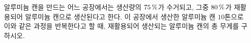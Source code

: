 알루미늄 캔을 만드는 어느 공장에서는 생산량의 $75\mkern3mu \%$가 수거되고, 그중 $80\mkern3mu \%$가 재활용되어 알루미늄 캔으로 생산된다고 한다. 이 공장에서 생산한 알루미늄 캔 $10$톤으로 이와 같은 과정을 반복한다고 할 때, 재활용되어 생산되는 알루미늄 캔의 총 무게를 구하시오.
